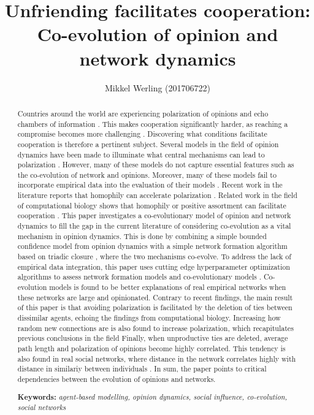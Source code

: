 \documentclass{article}
\title{Unfriending facilitates cooperation: \\Co-evolution of opinion and network dynamics}
\author{Mikkel Werling (201706722)}
\date{}
\begin{document}
\maketitle
\begin{abstract}
  \noindent Countries around the world are experiencing polarization of opinions and echo chambers of information \cite{del_vicario_echo_2016,tsai_echo_2020,sasahara_social_2021}. 
  This makes cooperation significantly harder, as reaching a compromise becomes more challenging \cite{boxell_cross-country_2020}. 
  Discovering what conditions facilitate cooperation is therefore a pertinent subject. 
  Several models in the field of opinion dynamics have been made to illuminate what central mechanisms can lead to polarization \cite{flache_models_2017}.
  However, many of these models do not capture essential features such as the co-evolution of network and opinions. Moreover, many of these models fail to incorporate empirical data into the evaluation of their models \cite{flache_models_2017,galesic_integrating_2021}.
  Recent work in the literature reports that homophily can accelerate polarization \cite{sasahara_social_2021, taylor_exploring_2018}. 
  Related work in the field of computational biology shows that homophily or positive assortment can facilitate cooperation \cite{carter2015phenotypic, pepper_mechanism_2002,dakin_dynamic_2018, santos_cooperation_2006}. 
  This paper investigates a co-evolutionary model of opinion and network dynamics to fill the gap in the current literature of considering co-evolution as a vital mechanism in opinion dynamics. This is done by combining a simple bounded confidence model from opinion dynamics with a simple network formation algorithm based on triadic closure \cite{jackson_meeting_2007}, where the two mechanisms co-evolve.
  To address the lack of empirical data integration, this paper uses cutting edge hyperparameter optimization algorithms to assess network formation models and co-evolutionary models \cite{krivorotko2022agent,akiba_optuna_2019}. 
  Co-evolution models is found to be better explanations of real empirical networks when these networks are large and opinionated. 
  Contrary to recent findings, the main result of this paper is that avoiding polarization is facilitated by the deletion of ties between dissimilar agents, echoing the findings from computational biology.
  Increasing how random new connections are is also found to increase polarization, which recapitulates previous conclusions in the field \cite{turner_paths_2018,flache_why_2006,flache_small_2011}
  Finally, when unproductive ties are deleted, average path length and polarization of opinions become highly correlated. This tendency is also found in real social networks, where distance in the network correlates highly with distance in similariy between individuals \cite{kossinets_origins_2009}. 
  In sum, the paper points to critical dependencies between the evolution of opinions and networks.
  
  \noindent \textbf{Keywords:} \textit{agent-based modelling, opinion dynamics, social influence, co-evolution, social networks}
\end{abstract}
\end{document}
